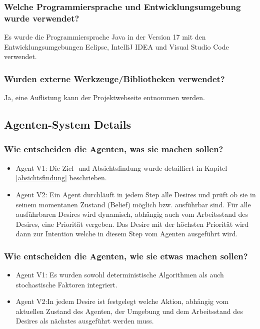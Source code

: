 \documentclass[runningheads]{llncs}
\begin{document}
	\subsubsection{Welche Programmiersprache und Entwicklungsumgebung wurde verwendet?\\}
	Es wurde die Programmiersprache Java in der Version 17 mit den Entwicklungsumgebungen Eclipse, IntelliJ IDEA und Visual Studio Code verwendet.
	\subsubsection{Wurden externe Werkzeuge/Bibliotheken verwendet?\\}
	Ja, eine Auflistung kann der Projektwebseite \cite{Site} entnommen werden.
	\subsection{Agenten-System Details}
	\subsubsection{Wie entscheiden die Agenten, was sie machen sollen?}
	\begin{itemize}
		\item Agent V1: Die Ziel- und Absichtsfindung wurde detailliert in Kapitel \ref{absichtsfindung} beschrieben. \\
		\item Agent V2: Ein Agent durchläuft in jedem Step alle Desires und prüft ob sie in seinem momentanen Zustand (Belief) möglich bzw. ausführbar sind. Für alle ausführbaren Desires wird dynamisch, abhängig auch vom Arbeitsstand des Desires, eine Priorität vergeben. Das Desire mit der höchsten Priorität wird dann zur Intention welche in diesem Step vom Agenten ausgeführt wird.
	\end{itemize}
	
	\subsubsection{Wie entscheiden die Agenten, wie sie etwas machen sollen?}
	\begin{itemize}
		\item Agent V1: Es wurden sowohl deterministische Algorithmen als auch stochastische Faktoren integriert.
		\item Agent V2:In jedem Desire ist festgelegt welche Aktion, abhängig vom aktuellen Zustand des Agenten, der Umgebung und dem Arbeitsstand des Desires als nächstes ausgeführt werden muss.  
	\end{itemize}
	
\end{document}
